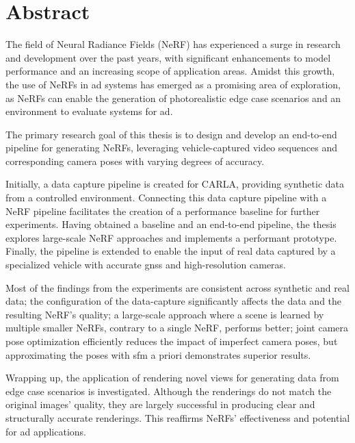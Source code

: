 \chapter*{Abstract}

The field of Neural Radiance Fields (NeRF) has experienced a surge in research and development over the past years, with significant enhancements to model performance and an increasing scope of application areas. Amidst this growth, the use of NeRFs in \acrfull{ad} systems has emerged as a promising area of exploration, as NeRFs can enable the generation of photorealistic edge case scenarios and an environment to evaluate systems for \acrshort{ad}.

The primary research goal of this thesis is to design and develop an end-to-end pipeline for generating NeRFs, leveraging vehicle-captured video sequences and corresponding camera poses with varying degrees of accuracy.

Initially, a data capture pipeline is created for CARLA, providing synthetic data from a controlled environment. Connecting this data capture pipeline with a NeRF pipeline facilitates the creation of a performance baseline for further experiments. Having obtained a baseline and an end-to-end pipeline, the thesis explores large-scale NeRF approaches and implements a performant prototype. Finally, the pipeline is extended to enable the input of real data captured by a specialized vehicle with accurate \acrfull{gnss} and high-resolution cameras.

Most of the findings from the experiments are consistent across synthetic and real data; the configuration of the data-capture significantly affects the data and the resulting NeRF's quality; a large-scale approach where a scene is learned by multiple smaller NeRFs, contrary to a single NeRF, performs better; joint camera pose optimization efficiently reduces the impact of imperfect camera poses, but approximating the poses with \acrfull{sfm} a priori demonstrates superior results.



Wrapping up, the application of rendering novel views for generating data from edge case scenarios is investigated. Although the renderings do not match the original images' quality, they are largely successful in producing clear and structurally accurate renderings. This reaffirms NeRFs' effectiveness and potential for \acrshort{ad} applications.